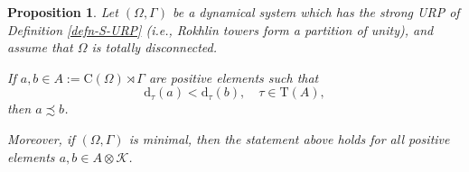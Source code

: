 \documentclass[12pt, oneside, psamsfonts]{amsart}
\newtheorem{prop}[thm]{Proposition}
\theoremstyle{definition}
\theoremstyle{remark}
\numberwithin{equation}{section}
\newcommand{\tr}{\mathrm{T}}
\begin{document}
\begin{prop}\label{main-thm}
Let $(\Omega, \Gamma)$ be a dynamical system which has the strong URP of Definition \ref{defn-S-URP} (i.e., Rokhlin towers form a partition of unity), and assume that $\Omega$ is totally disconnected. 

If $a, b  \in A:=\mathrm{C}(\Omega) \rtimes \Gamma$ are positive elements such that 
\begin{equation}\label{comp-equ}
\mathrm{d}_\tau(a) < \mathrm{d}_\tau(b),\quad \tau \in \tr(A),
\end{equation} 
then $a \precsim b$.

Moreover, if $(\Omega, \Gamma)$ is minimal, then the statement above holds for all positive elements $a, b \in A \otimes \mathcal K$. 
\end{prop}
\end{document}
